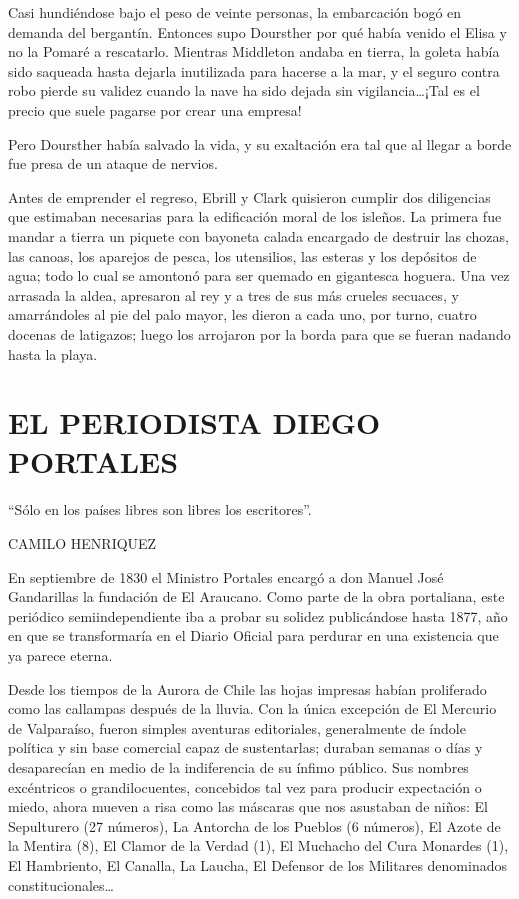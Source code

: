 \documentclass[10pt,twoside,openright]{memoir}
\begin{document}
Casi hundiéndose bajo el peso de
veinte personas, la embarcación bogó en demanda del bergantín. Entonces
supo Doursther por qué había venido el Elisa y no la Pomaré a
rescatarlo. Mientras Middleton andaba en tierra, la goleta había sido
saqueada hasta dejarla inutilizada para hacerse a la mar, y el seguro
contra robo pierde su validez cuando la nave ha sido dejada sin
vigilancia\ldots ¡Tal es el precio que suele pagarse por crear una empresa!

Pero Doursther había salvado la vida, y su exaltación era tal que al
llegar a borde fue presa de un ataque de nervios.

Antes de emprender el regreso, Ebrill y Clark quisieron cumplir dos
diligencias que estimaban necesarias para la edificación moral de los
isleños. La primera fue mandar a
tierra un piquete con bayoneta calada encargado de destruir las chozas,
las canoas, los aparejos de pesca, los utensilios, las esteras y los
depósitos de agua; todo lo cual se amontonó para ser
quemado
en gigantesca hoguera. Una vez arrasada la aldea, apresaron al rey y a
tres de sus más crueles secuaces, y amarrándoles al pie del palo mayor,
les dieron a cada uno, por turno, cuatro docenas de latigazos; luego los
arrojaron por la borda para que se fueran nadando hasta la playa.

\chapter{EL PERIODISTA DIEGO PORTALES}

\epigraph{``Sólo en los países libres son libres los escritores''.}{CAMILO HENRIQUEZ}

En septiembre de 1830 el Ministro Portales encargó a don Manuel José
Gandarillas la fundación de El
Araucano. Como parte de la obra portaliana,
este periódico semiindependiente iba
a probar su solidez publicándose hasta 1877, año en que se transformaría
en el Diario Oficial para perdurar en una existencia que ya parece
eterna.

Desde los tiempos de la Aurora de Chile las hojas impresas habían
proliferado como las callampas después de la lluvia. Con la única
excepción de El Mercurio de Valparaíso, fueron simples aventuras
editoriales, generalmente de índole política y sin base comercial capaz
de sustentarlas; duraban semanas o días y desaparecían en medio de la
indiferencia de su ínfimo público. Sus nombres excéntricos o
grandilocuentes, concebidos tal vez para producir expectación o miedo,
ahora mueven a risa como las máscaras que nos asustaban de niños: El
Sepulturero (27 números), La Antorcha de los Pueblos (6 números), El
Azote de la Mentira (8), El Clamor de la Verdad (1), El Muchacho del
Cura Monardes (1), El Hambriento, El Canalla, La Laucha, El Defensor de
los Militares denominados constitucionales\ldots{}
\end{document}
